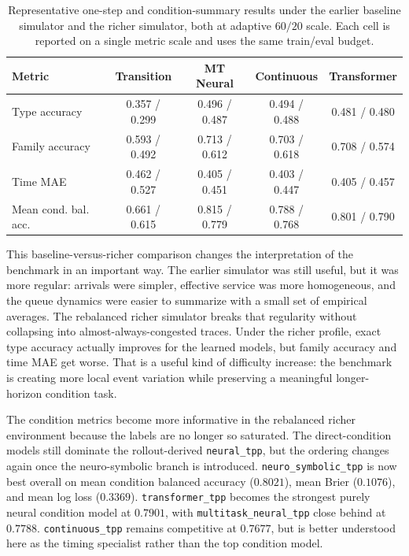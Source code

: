 \documentclass[11pt]{article}
\begin{document}
\begin{table}[H]
\centering
\small
\begin{tabular}{lcccc}
\toprule
Metric & Transition & MT Neural & Continuous & Transformer \\
\midrule
Type accuracy & 0.357 / 0.299 & 0.496 / 0.487 & 0.494 / 0.488 & 0.481 / 0.480 \\
Family accuracy & 0.593 / 0.492 & 0.713 / 0.612 & 0.703 / 0.618 & 0.708 / 0.574 \\
Time MAE & 0.462 / 0.527 & 0.405 / 0.451 & 0.403 / 0.447 & 0.405 / 0.457 \\
Mean cond. bal. acc. & 0.661 / 0.615 & 0.815 / 0.779 & 0.788 / 0.768 & 0.801 / 0.790 \\
\bottomrule
\end{tabular}
\caption{Representative one-step and condition-summary results under the earlier baseline simulator and the richer simulator, both at adaptive \(60/20\) scale. Each cell is reported on a single metric scale and uses the same train/eval budget.}
\label{tab:baseline_richer_event}
\end{table}

This baseline-versus-richer comparison changes the interpretation of the benchmark in an important way. The earlier simulator was still useful, but it was more regular: arrivals were simpler, effective service was more homogeneous, and the queue dynamics were easier to summarize with a small set of empirical averages. The rebalanced richer simulator breaks that regularity without collapsing into almost-always-congested traces. Under the richer profile, exact type accuracy actually improves for the learned models, but family accuracy and time MAE get worse. That is a useful kind of difficulty increase: the benchmark is creating more local event variation while preserving a meaningful longer-horizon condition task.

The condition metrics become more informative in the rebalanced richer environment because the labels are no longer so saturated. The direct-condition models still dominate the rollout-derived \texttt{neural\_tpp}, but the ordering changes again once the neuro-symbolic branch is introduced. \texttt{neuro\_symbolic\_tpp} is now best overall on mean condition balanced accuracy (\(0.8021\)), mean Brier (\(0.1076\)), and mean log loss (\(0.3369\)). \texttt{transformer\_tpp} becomes the strongest purely neural condition model at \(0.7901\), with \texttt{multitask\_neural\_tpp} close behind at \(0.7788\). \texttt{continuous\_tpp} remains competitive at \(0.7677\), but is better understood here as the timing specialist rather than the top condition model.
\end{document}
